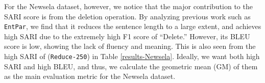 \documentclass[11pt,a4paper]{article}
\begin{document}
For the Newsela dataset, however, we notice that the major contribution to the SARI score is from the deletion operation. By analyzing previous work such as {\tt EntPar}, we find that it reduces the sentence length to a large extent, and achieves high SARI due to the extremely high F1 score of ``Delete.'' However, its BLEU score is low, showing the lack of fluency and meaning. This is also seen from the high SARI of ({\tt Reduce-250}) in Table \ref{results-Newsela}. 
Ideally, we want both high SARI and high BLEU, and thus, we calculate the geometric mean (GM) of them as the main evaluation metric for the Newsela dataset. 
\begin{table*}[t!]
\begin{center}
\end{center}\vspace{-.4cm}
\caption{\label{results-designchoices} Ablation test of the SLOR score based on syntax-aware language modeling.}
\end{table*}
\end{document}
